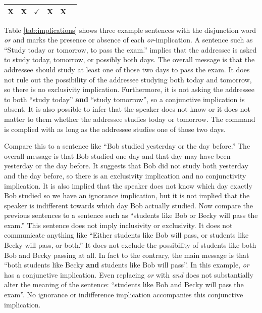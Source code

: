 \documentclass[oneside]{report}
\theoremstyle{definition}
\theoremstyle{definition}
\theoremstyle{definition}
\theoremstyle{remark}
\begin{document}
\begin{longtable}[]{@{}lccccc@{}}
\begin{minipage}[t]{0.05\columnwidth}
X\strut
\end{minipage} & \begin{minipage}[t]{0.05\columnwidth}\centering\strut
X\strut
\end{minipage} & \begin{minipage}[t]{0.05\columnwidth}\centering\strut
\(\checkmark\)\strut
\end{minipage} & \begin{minipage}[t]{0.12\columnwidth}\centering\strut
X\strut
\end{minipage} & \begin{minipage}[t]{0.12\columnwidth}\centering\strut
X\strut
\end{minipage}\tabularnewline
\bottomrule
\end{longtable}
Table \ref{tab:implications} shows three example sentences with the
disjunction word \emph{or} and marks the presence or absence of each
\emph{or}-implication. A sentence such as ``Study today or tomorrow, to
pass the exam.'' implies that the addressee is asked to study today,
tomorrow, or possibly both days. The overall message is that the
addressee should study at least one of those two days to pass the exam.
It does not rule out the possibility of the addressee studying both
today and tomorrow, so there is no exclusivity implication. Furthermore,
it is not asking the addressee to both ``study today'' \textbf{and}
``study tomorrow'', so a conjunctive implication is absent. It is also
possible to infer that the speaker does not know or it does not matter
to them whether the addressee studies today or tomorrow. The command is
complied with as long as the addressee studies one of those two days.

Compare this to a sentence like ``Bob studied yesterday or the day
before.'' The overall message is that Bob studied one day and that day
may have been yesterday or the day before. It suggests that Bob did not
study both yesterday and the day before, so there is an exclusivity
implication and no conjunctivity implication. It is also implied that
the speaker does not know which day exactly Bob studied so we have an
ignorance implication, but it is not implied that the speaker is
indifferent towards which day Bob actually studied. Now compare the
previous sentences to a sentence such as ``students like Bob or Becky
will pass the exam.'' This sentence does not imply inclusivity or
exclusivity. It does not communicate anything like ``Either students
like Bob will pass, or students like Becky will pass, or both.'' It does
not exclude the possibility of students like both Bob and Becky passing
at all. In fact to the contrary, the main message is that ``both
students like Becky \textbf{and} students like Bob will pass''. In this
example, \emph{or} has a conjunctive implication. Even replacing
\emph{or} with \emph{and} does not substantially alter the meaning of
the sentence: ``students like Bob and Becky will pass the exam''. No
ignorance or indifference implication accompanies this conjunctive
implication.
\end{document}
